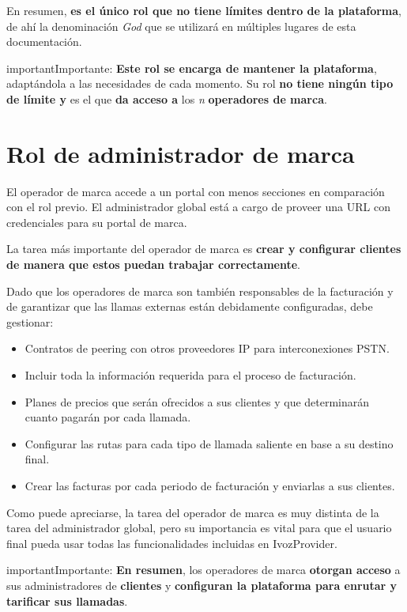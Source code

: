 \documentclass[letterpaper,10pt,spanish]{sphinxmanual}
\begin{document}
En resumen, \textbf{es el único rol que no tiene límites dentro de la plataforma}, de ahí la denominación \emph{God} que se utilizará en múltiples lugares de esta documentación.

\begin{notice}{important}{Importante:}
\textbf{Este rol se encarga de mantener la plataforma}, adaptándola a las necesidades de cada momento. Su rol \textbf{no tiene ningún tipo de límite y} es el que \textbf{da acceso a} los \emph{n} \textbf{operadores de marca}.
\end{notice}


\section{Rol de administrador de marca}
\label{basic_concepts/operation_roles/index:brand-administrator-role}
El operador de marca accede a un portal con menos secciones en comparación con el rol previo. El administrador global está a cargo de proveer una URL con credenciales para su portal de marca.

La tarea más importante del operador de marca es \textbf{crear y configurar clientes de manera que estos puedan trabajar correctamente}.

Dado que los operadores de marca son también responsables de la facturación y de garantizar que las llamas externas están debidamente configuradas, debe gestionar:
\begin{itemize}
\item {} 
Contratos de peering con otros proveedores IP para interconexiones PSTN.

\item {} 
Incluir toda la información requerida para el proceso de facturación.

\item {} 
Planes de precios que serán ofrecidos a sus clientes y que determinarán cuanto pagarán por cada llamada.

\item {} 
Configurar las rutas para cada tipo de llamada saliente en base a su destino final.

\item {} 
Crear las facturas por cada periodo de facturación y enviarlas a sus clientes.

\end{itemize}

Como puede apreciarse, la tarea del operador de marca es muy distinta de la tarea del administrador global, pero su importancia es vital para que el usuario final pueda usar todas las funcionalidades incluidas en IvozProvider.
\label{basic_concepts/operation_roles/index:brand-responsibilities}
\begin{notice}{important}{Importante:}
\textbf{En resumen}, los operadores de marca \textbf{otorgan acceso} a sus administradores de \textbf{clientes} y \textbf{configuran la plataforma para enrutar y tarificar sus llamadas}.
\end{notice}
\end{document}
